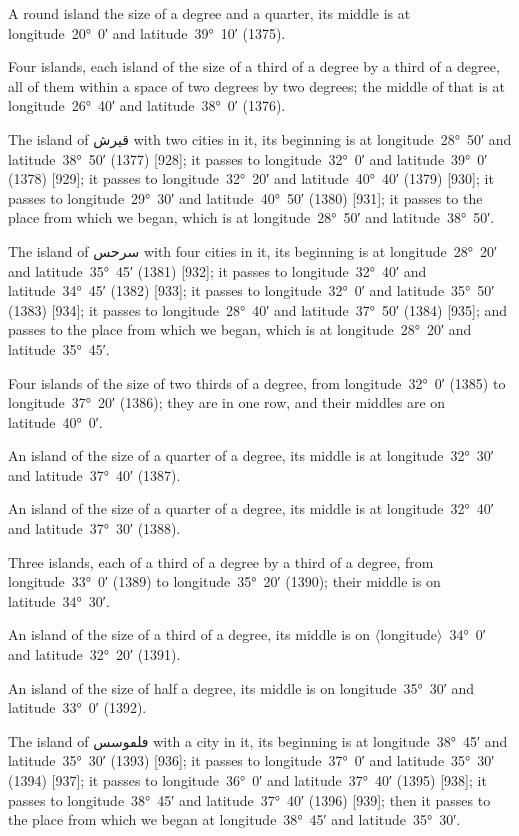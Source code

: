 \documentclass[11pt]{article}
\newcommand{\Pg}[1]{\marginpar{\footnotesize #1}}
\newcommand{\Ang}[1]{\ensuremath{#1}}
\begin{document}
A round island the size of a degree and a quarter, its middle is at longitude~20°~0′ and latitude~39°~10′ (1375)\Pg{p. 90}.

Four islands, each island of the size of a third of a degree by a third of a degree, all of them within a space of two degrees by two degrees; the middle of that is at longitude~26°~40′ and latitude~38°~0′ (1376).

The island of \textarabic{قيرش} with two cities in it, its beginning is at longitude~28°~50′ and latitude~38°~50′ (1377) [928]; it passes to longitude~32°~0′ and latitude~39°~0′ (1378) [929]; it passes to longitude~32°~20′ and latitude~40°~40′ (1379) [930]; it passes to longitude~29°~30′ and latitude~40°~50′ (1380) [931]; it passes to the place from which we began, which is at longitude~28°~50′ and latitude~38°~50′.

The island of \textarabic{سرحس} with four cities in it, its beginning is at longitude~28°~20′ and latitude~35°~45′ (1381) [932]; it passes to longitude~32°~40′ and latitude~34°~45′ (1382) [933]; it passes to longitude~32°~0′ and latitude~35°~50′ (1383) [934]; it passes to longitude~28°~40′ and latitude~37°~50′ (1384) [935]; and passes to the place from which we began, which is at longitude~28°~20′ and latitude~35°~45′.

Four islands of the size of two thirds of a degree, from longitude~32°~0′ (1385) to longitude~37°~20′ (1386); they are in one row, and their middles are on latitude~40°~0′.

An island of the size of a quarter of a degree, its middle is at longitude~32°~30′ and latitude~37°~40′ (1387).

An island of the size of a quarter of a degree, its middle is at longitude~32°~40′ and latitude~37°~30′ (1388).

Three islands, each of a third of a degree by a third of a degree, from longitude~33°~0′ (1389) to longitude~35°~20′ (1390); their middle is on latitude~34°~30′.

An island of the size of a third of a degree, its middle is on \Ang{\langle}longitude\Ang{\rangle}~34°~0′ and latitude~32°~20′ (1391).

An island of the size of half a degree, its middle is on longitude~35°~30′ and latitude~33°~0′ (1392)\Pg{p. 91}.

The island of \textarabic{ڡلڡوسس} with a city in it, its beginning is at longitude~38°~45′ and latitude~35°~30′ (1393) [936]; it passes to longitude~37°~0′ and latitude~35°~30′ (1394) [937]; it passes to longitude~36°~0′ and latitude~37°~40′ (1395) [938]; it passes to longitude~38°~45′ and latitude~37°~40′ (1396) [939]; then it passes to the place from which we began at longitude~38°~45′ and latitude~35°~30′.
\end{document}
